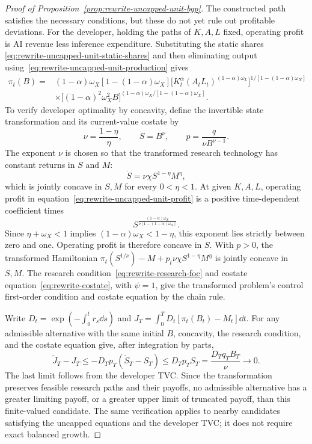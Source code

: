 \begin{proof}[Proof of Proposition~\ref{prop:rewrite-uncapped-unit-bgp}]
The constructed path satisfies the necessary conditions, but these do
not yet rule out profitable deviations. For the developer, holding the
paths of $K,A,L$ fixed, operating profit is AI revenue less inference
expenditure. Substituting the static shares
\eqref{eq:rewrite-uncapped-unit-static-shares} and then eliminating output
using~\eqref{eq:rewrite-uncapped-unit-production} gives
\begin{equation}
 \begin{split}
 \pi_t(B)={}&(1-\alpha)\omega_X[1-(1-\alpha)\omega_X]
 \bigl[K_t^\alpha(A_tL_t)^{(1-\alpha)\omega_L}\bigr]^{1/[1-(1-\alpha)\omega_X]}\\
 &\times\bigl[(1-\alpha)^2\omega_X^2B\bigr]^{(1-\alpha)\omega_X/[1-(1-\alpha)\omega_X]}.
 \end{split}
 \label{eq:rewrite-uncapped-unit-profit}
\end{equation}
To verify developer optimality by concavity, define the invertible state
transformation and its current-value costate by
\begin{equation}
 \nu=\frac{1-\eta}{\eta},\qquad
 S=B^\nu,\qquad p=\frac{q}{\nu B^{\nu-1}}.
 \label{eq:rewrite-uncapped-unit-transformed-state}
\end{equation}
The exponent $\nu$ is chosen so that the transformed research technology
has constant returns in $S$ and $M$:
\[
 \dot S=\nu\chi S^{1-\eta}M^\eta,
\]
which is jointly concave in $S,M$ for every $0<\eta<1$.
At given $K,A,L$, operating profit in
equation~\eqref{eq:rewrite-uncapped-unit-profit} is a positive
time-dependent coefficient times
\[
 S^{\frac{(1-\alpha)\omega_X}
 {\nu[1-(1-\alpha)\omega_X]}}.
\]
Since $\eta+\omega_X<1$ implies $(1-\alpha)\omega_X<1-\eta$, this
exponent lies strictly between zero and one. Operating profit is therefore
concave in $S$. With $p>0$, the transformed Hamiltonian
$\pi_t(S^{1/\nu})-M+p_t\nu\chi S^{1-\eta}M^\eta$ is jointly concave in $S,M$.
The research condition~\eqref{eq:rewrite-research-foc} and costate
equation~\eqref{eq:rewrite-costate}, with $\psi=1$, give the transformed
problem's control first-order condition and costate equation by the chain rule.

Write $D_t=\exp(-\int_0^t r_s\dd s)$ and
$J_T=\int_0^T D_t[\pi_t(B_t)-M_t]\dd t$.
For any admissible alternative with the same initial $B$, concavity,
the research condition, and the costate equation give, after integration
by parts,
\begin{equation}
 \widetilde J_T-J_T
 \leq-D_Tp_T(\widetilde S_T-S_T)
 \leq D_Tp_TS_T
 =\frac{D_Tq_TB_T}{\nu}\longrightarrow0.
 \label{eq:rewrite-uncapped-unit-developer-verification}
\end{equation}
The last limit follows from the developer TVC. Since the transformation
preserves feasible research paths and their payoffs, no admissible
alternative has a greater limiting payoff, or a greater upper limit of
truncated payoff, than this finite-valued candidate. The same verification
applies to nearby candidates satisfying the uncapped equations and the
developer TVC; it does not require exact balanced growth.


\end{proof}
